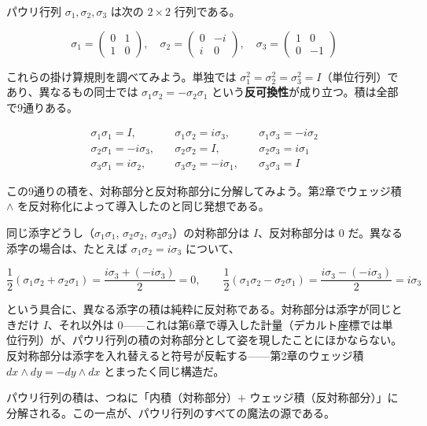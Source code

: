 \documentclass[a4paper,12pt,openany]{book}
\begin{document}
パウリ行列 \(\sigma_1, \sigma_2, \sigma_3\) は次の \(2\times2\)
行列である。

\[
\sigma_1 = \begin{pmatrix}0 & 1 \\ 1 & 0\end{pmatrix},\quad
\sigma_2 = \begin{pmatrix}0 & -i \\ i & 0\end{pmatrix},\quad
\sigma_3 = \begin{pmatrix}1 & 0 \\ 0 & -1\end{pmatrix}
\]

これらの掛け算規則を調べてみよう。単独では
\(\sigma_1^2 = \sigma_2^2 = \sigma_3^2 = I\)（単位行列）であり、異なるもの同士では
\(\sigma_1\sigma_2 = -\sigma_2\sigma_1\)
という\textbf{反可換性}が成り立つ。積は全部で9通りある。

\[
\begin{aligned}
\sigma_1\sigma_1 = I,\quad &\sigma_1\sigma_2 = i\sigma_3,\quad &\sigma_1\sigma_3 = -i\sigma_2 \\
\sigma_2\sigma_1 = -i\sigma_3,\quad &\sigma_2\sigma_2 = I,\quad &\sigma_2\sigma_3 = i\sigma_1 \\
\sigma_3\sigma_1 = i\sigma_2,\quad &\sigma_3\sigma_2 = -i\sigma_1,\quad &\sigma_3\sigma_3 = I
\end{aligned}
\]

この9通りの積を、対称部分と反対称部分に分解してみよう。第2章でウェッジ積
\(\wedge\) を反対称化によって導入したのと同じ発想である。

同じ添字どうし（\(\sigma_1\sigma_1\), \(\sigma_2\sigma_2\),
\(\sigma_3\sigma_3\)）の対称部分は \(I\)、反対称部分は \(0\)
だ。異なる添字の場合は、たとえば \(\sigma_1\sigma_2 = i\sigma_3\)
について、

\[
\frac{1}{2}(\sigma_1\sigma_2 + \sigma_2\sigma_1) = \frac{i\sigma_3 + (-i\sigma_3)}{2} = 0,\qquad
\frac{1}{2}(\sigma_1\sigma_2 - \sigma_2\sigma_1) = \frac{i\sigma_3 - (-i\sigma_3)}{2} = i\sigma_3
\]

という具合に、異なる添字の積は純粋に反対称である。対称部分は添字が同じときだけ
\(I\)、それ以外は
\(0\)——これは第6章で導入した計量（デカルト座標では単位行列）が、パウリ行列の積の対称部分として姿を現したことにほかならない。反対称部分は添字を入れ替えると符号が反転する——第2章のウェッジ積
\(dx\wedge dy = -dy\wedge dx\) とまったく同じ構造だ。

パウリ行列の積は、つねに「内積（対称部分）\(+\)
ウェッジ積（反対称部分）」に分解される。この一点が、パウリ行列のすべての魔法の源である。
\end{document}
